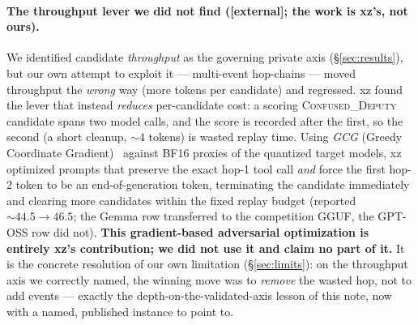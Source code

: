 \documentclass[11pt]{article}
\newcommand{\evtag}[1]{{\small\textsf{[#1]}}}
\begin{document}
\paragraph{The throughput lever we did not find (\evtag{external}; the work is xz's, not ours).} We
identified candidate \emph{throughput} as the governing private axis (\S\ref{sec:results}), but our own
attempt to exploit it --- multi-event hop-chains --- moved throughput the \emph{wrong} way (more tokens
per candidate) and regressed. xz found the lever that instead \emph{reduces} per-candidate cost: a
scoring \textsc{Confused\_Deputy} candidate spans two model calls, and the score is recorded after the
first, so the second (a short cleanup, $\sim\!4$ tokens) is wasted replay time. Using \emph{GCG} (Greedy
Coordinate Gradient)~\cite{gcg} against BF16 proxies of the quantized target models, xz optimized prompts
that preserve the exact hop-1 tool call \emph{and} force the first hop-2 token to be an end-of-generation
token, terminating the candidate immediately and clearing more candidates within the fixed replay budget
(reported $\sim\!44.5\!\to\!46.5$; the Gemma row transferred to the competition GGUF, the GPT-OSS row did
not). \textbf{This gradient-based adversarial optimization is entirely xz's contribution; we did not use
it and claim no part of it.} It is the concrete resolution of our own limitation (\S\ref{sec:limits}): on
the throughput axis we correctly named, the winning move was to \emph{remove} the wasted hop, not to add
events --- exactly the depth-on-the-validated-axis lesson of this note, now with a named, published
instance to point to.
\end{document}
